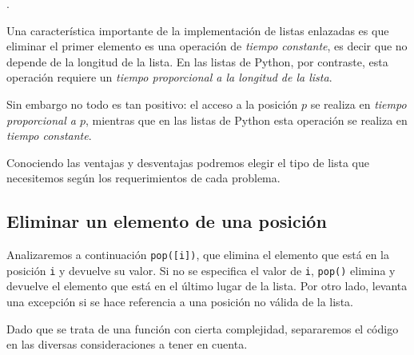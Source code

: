 .

\begin{sabias_que}
Una característica importante de la implementación de listas enlazadas es que
eliminar el primer elemento es una operación de \emph{tiempo constante}, es
decir que no depende de la longitud de la lista. En las listas de
Python, por contraste, esta operación requiere un \emph{tiempo proporcional a la
longitud de la lista}.

Sin embargo no todo es tan positivo: el acceso a la posición $p$ se realiza
en \emph{tiempo proporcional a $p$}, mientras que en las listas de Python esta
operación se realiza en \emph{tiempo constante}.

Conociendo las ventajas y desventajas podremos elegir el tipo de lista que
necesitemos según los requerimientos de cada problema.
\end{sabias_que}

\subsection{Eliminar un elemento de una posición}

Analizaremos a continuación \lstinline|pop([i])|, que elimina el elemento que
está en la posición \lstinline!i! y devuelve su valor. Si no se especifica
el valor de \lstinline!i!, \lstinline|pop()| elimina y devuelve el elemento
que está en el último lugar de la lista.  Por otro lado, levanta una
excepción si se hace referencia a una posición no válida de la lista.

Dado que se trata de una función con cierta complejidad, separaremos el
código en las diversas consideraciones a tener en cuenta.


